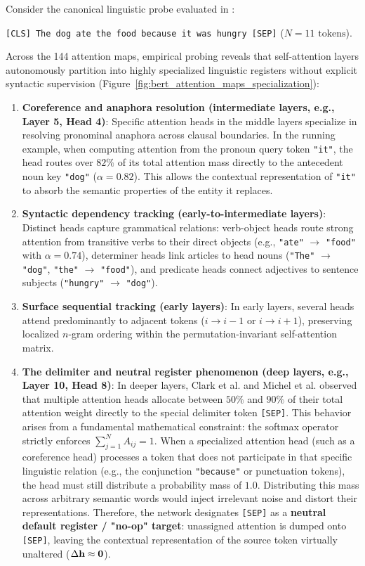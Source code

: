 \documentclass[../../main.tex]{subfiles}
\begin{document}
Consider the canonical linguistic probe evaluated in \cite{clark2019what}:
\begin{center}
\texttt{[CLS] The dog ate the food because it was hungry [SEP]} \quad ($N = 11 \text{ tokens}$).
\end{center}
Across the 144 attention maps, empirical probing reveals that self-attention layers autonomously partition into highly specialized linguistic registers without explicit syntactic supervision (Figure~\ref{fig:bert_attention_maps_specialization}):
\begin{enumerate}
    \item \textbf{Coreference and anaphora resolution (intermediate layers, e.g., Layer 5, Head 4)}:
    Specific attention heads in the middle layers specialize in resolving pronominal anaphora across clausal boundaries. In the running example, when computing attention from the pronoun query token \texttt{"it"}, the head routes over $82\%$ of its total attention mass directly to the antecedent noun key \texttt{"dog"} ($\alpha = 0.82$). This allows the contextual representation of \texttt{"it"} to absorb the semantic properties of the entity it replaces.
    \item \textbf{Syntactic dependency tracking (early-to-intermediate layers)}:
    Distinct heads capture grammatical relations: verb-object heads route strong attention from transitive verbs to their direct objects (e.g., \texttt{"ate"} $\to$ \texttt{"food"} with $\alpha = 0.74$), determiner heads link articles to head nouns (\texttt{"The"} $\to$ \texttt{"dog"}, \texttt{"the"} $\to$ \texttt{"food"}), and predicate heads connect adjectives to sentence subjects (\texttt{"hungry"} $\to$ \texttt{"dog"}).
    \item \textbf{Surface sequential tracking (early layers)}:
    In early layers, several heads attend predominantly to adjacent tokens ($i \to i-1$ or $i \to i+1$), preserving localized $n$-gram ordering within the permutation-invariant self-attention matrix.
    \item \textbf{The delimiter and neutral register phenomenon (deep layers, e.g., Layer 10, Head 8)}:
    In deeper layers, Clark et al. \cite{clark2019what} and Michel et al. \cite{michel2019sixteen} observed that multiple attention heads allocate between $50\%$ and $90\%$ of their total attention weight directly to the special delimiter token \texttt{[SEP]}.
    This behavior arises from a fundamental mathematical constraint: the softmax operator strictly enforces $\sum_{j=1}^N A_{ij} = 1$. When a specialized attention head (such as a coreference head) processes a token that does not participate in that specific linguistic relation (e.g., the conjunction \texttt{"because"} or punctuation tokens), the head must still distribute a probability mass of $1.0$. Distributing this mass across arbitrary semantic words would inject irrelevant noise and distort their representations. Therefore, the network designates \texttt{[SEP]} as a \textbf{neutral default register / "no-op" target}: unassigned attention is dumped onto \texttt{[SEP]}, leaving the contextual representation of the source token virtually unaltered ($\Delta \mathbf{h} \approx \mathbf{0}$).
\end{enumerate}
\end{document}
